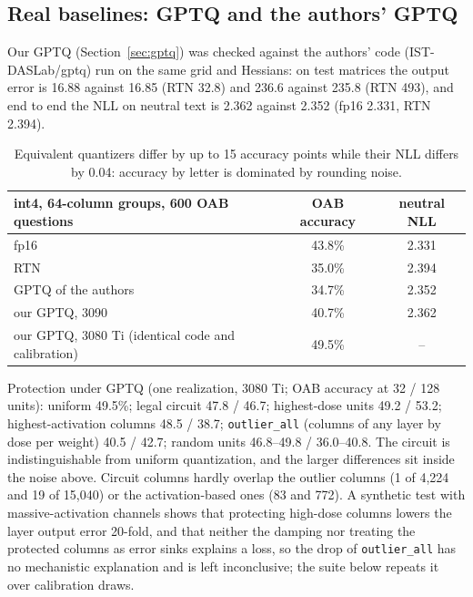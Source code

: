 \documentclass[11pt]{article}
\newcommand{\code}[1]{\texttt{#1}}
\begin{document}
\subsection{Real baselines: GPTQ and the authors' GPTQ}
Our GPTQ (Section~\ref{sec:gptq}) was checked against the authors' code (IST-DASLab/gptq) run on the same grid and Hessians: on test matrices the output error is 16.88 against 16.85 (RTN 32.8) and 236.6 against 235.8 (RTN 493), and end to end the NLL on neutral text is 2.362 against 2.352 (fp16 2.331, RTN 2.394).
\begin{table}[h]
\centering\small
\begin{tabular}{lcc}
\toprule
int4, 64-column groups, 600 OAB questions & OAB accuracy & neutral NLL\\
\midrule
fp16 & 43.8\% & 2.331\\
RTN & 35.0\% & 2.394\\
GPTQ of the authors & 34.7\% & 2.352\\
our GPTQ, 3090 & 40.7\% & 2.362\\
our GPTQ, 3080 Ti (identical code and calibration) & 49.5\% & --\\
\bottomrule
\end{tabular}
\caption{Equivalent quantizers differ by up to 15 accuracy points while their NLL differs by 0.04: accuracy by letter is dominated by rounding noise.}
\label{tab:gptqval}
\end{table}
Protection under GPTQ (one realization, 3080 Ti; OAB accuracy at 32 / 128 units): uniform 49.5\%; legal circuit 47.8 / 46.7; highest-dose units 49.2 / 53.2; highest-activation columns 48.5 / 38.7; \code{outlier\_all} (columns of any layer by dose per weight) 40.5 / 42.7;
random units 46.8--49.8 / 36.0--40.8. The circuit is indistinguishable from uniform quantization, and the larger differences sit inside the noise above. Circuit columns hardly overlap the outlier columns (1 of 4{,}224 and 19 of 15{,}040) or the activation-based ones (83 and 772).
A synthetic test with massive-activation channels shows that protecting high-dose columns lowers the layer output error 20-fold, and that neither the damping nor treating the protected columns as error sinks explains a loss, so the drop of \code{outlier\_all} has no mechanistic explanation and is left inconclusive;
the suite below repeats it over calibration draws.
\end{document}
